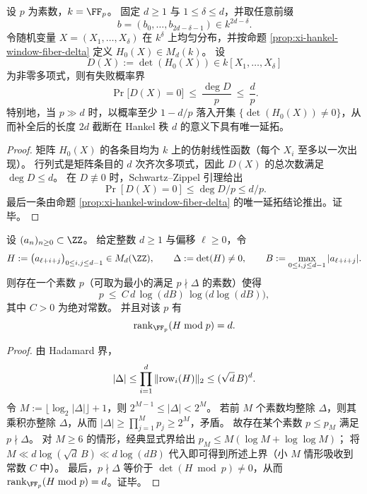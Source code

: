 \begin{theorem}[有限域随机补全的通用非退化失败率]\label{thm:xi-hankel-finitefield-random-completion-nondegenerate}
设 \(p\) 为素数，\(k=\FF_p\)。
固定 \(d\ge 1\) 与 \(1\le \delta\le d\)，并取任意前缀
\[
b=(b_0,\dots,b_{2d-\delta-1})\in k^{2d-\delta}.
\]
令随机变量 \(X=(X_1,\dots,X_\delta)\) 在 \(k^\delta\) 上均匀分布，并按命题 \ref{prop:xi-hankel-window-fiber-delta} 定义 \(H_0(X)\in M_d(k)\)。
设
\[
D(X):=\det(H_0(X))\in k[X_1,\dots,X_\delta]
\]
为非零多项式，则有失败概率界
\[
\Pr\bigl[D(X)=0\bigr]\ \le\ \frac{\deg D}{p}\ \le\ \frac{d}{p}.
\]
特别地，当 \(p\gg d\) 时，以概率至少 \(1-d/p\) 落入开集 \(\{\det(H_0(X))\neq 0\}\)，从而补全后的长度 \(2d\) 截断在 Hankel 秩 \(d\) 的意义下具有唯一延拓。
\end{theorem}
\begin{proof}
矩阵 \(H_0(X)\) 的各条目均为 \(k\) 上的仿射线性函数（每个 \(X_i\) 至多以一次出现）。
行列式是矩阵条目的 \(d\) 次齐次多项式，因此 \(D(X)\) 的总次数满足 \(\deg D\le d\)。
在 \(D\not\equiv 0\) 时，Schwartz--Zippel 引理给出
\[
\Pr[D(X)=0]\le \deg D/p\le d/p.
\]
最后一条由命题 \ref{prop:xi-hankel-window-fiber-delta} 的唯一延拓结论推出。证毕。
\end{proof}

\begin{theorem}[汉克尔模素审计的显式好素数上界]\label{thm:xi-hankel-explicit-good-prime-bound}
设 \((a_n)_{n\ge 0}\subset\ZZ\)。
给定整数 \(d\ge 1\) 与偏移 \(\ell\ge 0\)，令
\[
H:=\bigl(a_{\ell+i+j}\bigr)_{0\le i,j\le d-1}\in M_d(\ZZ),
\qquad
\Delta:=\det(H)\neq 0,
\qquad
B:=\max_{0\le i,j\le d-1}|a_{\ell+i+j}|.
\]
则存在一个素数 \(p\)（可取为最小的满足 \(p\nmid \Delta\) 的素数）使得
\[
p\ \le\ C\,d\,\log(dB)\,\log\!\bigl(d\log(dB)\bigr),
\]
其中 \(C>0\) 为绝对常数。
并且对该 \(p\) 有
\[
\mathrm{rank}_{\FF_p}(H\bmod p)=d.
\]
\end{theorem}
\begin{proof}
由 Hadamard 界，
\[
|\Delta|
\le \prod_{i=1}^{d}\|{\rm row}_i(H)\|_2
\le (\sqrt d\,B)^{d}.
\]
令 \(M:=\lfloor \log_2|\Delta|\rfloor+1\)，则 \(2^{M-1}\le |\Delta|<2^M\)。
若前 \(M\) 个素数均整除 \(\Delta\)，则其乘积亦整除 \(\Delta\)，从而
\(
|\Delta|\ge \prod_{j=1}^{M}p_j\ge 2^M
\)，矛盾。
故存在某个素数 \(p\le p_M\) 满足 \(p\nmid \Delta\)。
对 \(M\ge 6\) 的情形，经典显式界给出 \(p_M\le M(\log M+\log\log M)\)；
将
\(
M\ll d\log(\sqrt d\,B)\ll d\log(dB)
\)
代入即可得到所述上界（小 \(M\) 情形吸收到常数 \(C\) 中）。
最后，\(p\nmid\Delta\) 等价于 \(\det(H\bmod p)\neq 0\)，从而 \(\mathrm{rank}_{\FF_p}(H\bmod p)=d\)。证毕。
\end{proof}

